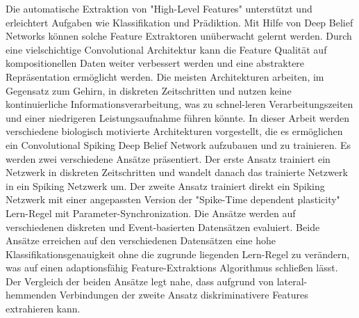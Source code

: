 Die automatische Extraktion von "High-Level Features" unterstützt und erleichtert Aufgaben wie Klassifikation und Prädiktion.
Mit Hilfe von Deep Belief Networks können solche Feature Extraktoren unüberwacht gelernt werden.
Durch eine vielschichtige Convolutional Architektur kann die Feature Qualität auf kompositionellen Daten weiter verbessert werden und eine abstraktere Repräsentation ermöglicht werden.
Die meisten Architekturen arbeiten, im Gegensatz zum Gehirn, in diskreten Zeitschritten und nutzen keine kontinuierliche Informationsverarbeitung, was zu schnel-leren Verarbeitungszeiten und einer niedrigeren Leistungsaufnahme führen könnte.
In dieser Arbeit werden verschiedene biologisch motivierte Architekturen vorgestellt, die es ermöglichen ein Convolutional Spiking Deep Belief Network aufzubauen und zu trainieren.
Es werden zwei verschiedene Ansätze präsentiert.
Der erste Ansatz trainiert ein Netzwerk in diskreten Zeitschritten und wandelt danach das trainierte Netzwerk in ein Spiking Netzwerk um.
Der zweite Ansatz trainiert direkt ein Spiking Netzwerk mit einer angepassten Version der "Spike-Time dependent plasticity" Lern-Regel mit Parameter-Synchronization.
Die Ansätze werden auf verschiedenen diskreten und Event-basierten Datensätzen evaluiert.
Beide Ansätze erreichen auf den verschiedenen Datensätzen eine hohe Klassifikationsgenauigkeit ohne die zugrunde liegenden Lern-Regel zu verändern, was auf einen adaptionsfähig Feature-Extraktions Algorithmus schließen lässt.
Der Vergleich der beiden Ansätze legt nahe, dass aufgrund von lateral-hemmenden Verbindungen der zweite Ansatz diskriminativere Features extrahieren kann. 

        